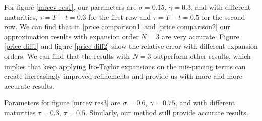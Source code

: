 For figure \ref{mrcev res1}, our parameters are $\sigma=0.15$, $\gamma=0.3$, and with different maturities, $\tau=T-t=0.3$ for the first row and $\tau=T-t=0.5$ for the second row. We can find that in \ref{price comparison1} and \ref{price comparison2} our approximation results with expansion order $N=3$ are very accurate. Figure \ref{price diff1} and figure \ref{price diff2} show the relative error with different expansion orders. We can find that the results with $N=3$ outperform other results, which implies that keep applying Ito-Taylor expansions on the mis-pricing terms can create increasingly improved refinements and provide us with more and more accurate results.

Parameters for figure \ref{mrcev res3} are $\sigma=0.6$, $\gamma=0.75$, and with different maturities $\tau=0.3$, $\tau=0.5$. Similarly, our method still provide accurate results.


